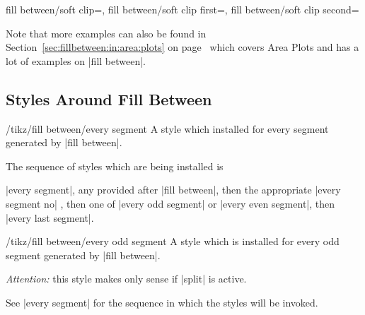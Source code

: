 \begin{tikzkeylist}{%
	fill between/soft clip=,%
	fill between/soft clip first=,%
	fill between/soft clip second=%
}
\begin{codeexample}[]
\end{codeexample}


	Note that more examples can also be found in Section~\ref{sec:fillbetween:in:area:plots} on page~\pageref{sec:fillbetween:in:area:plots} which covers Area Plots and has a lot of examples on |fill between|.
\end{tikzkeylist}

\subsection{Styles Around Fill Between}

\begin{stylekey}{/tikz/fill between/every segment}
	A style which installed for every segment generated by |fill between|.

	The sequence of styles which are being installed is 

	|every segment|, any  provided after | fill between|, then the appropriate |every segment no| , then one of |every odd segment| or |every even segment|, then |every last segment|.
\end{stylekey}

\begin{stylekey}{/tikz/fill between/every odd segment}
	A style which is installed for every odd segment generated by |fill between|.

	\emph{Attention:} this style makes only sense if |split| is active.

	See |every segment| for the sequence in which the styles will be invoked.
\end{stylekey}

